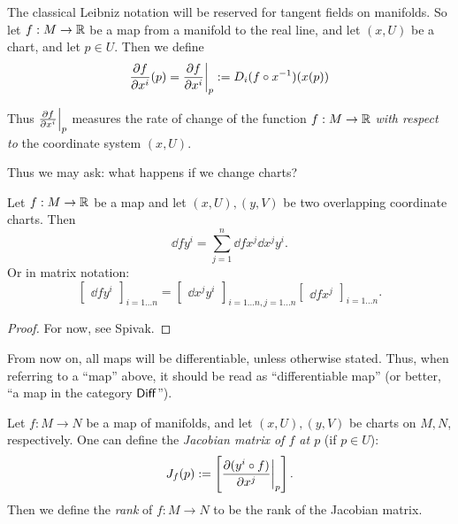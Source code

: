 \documentclass[11pt, english]{article}
\begin{document}
The classical Leibniz notation will be reserved for tangent fields on manifolds. So let $f:M \to \mathbb{R}$ be a map from a manifold to the real line, and let $(x,U)$ be a chart, and let $p \in U$. Then we define
\[
\frac{\partial f}{\partial  x^i} (p) = \restr{\frac{\partial f}{\partial x^i}}p := D_i(f \circ x^{-1})(x(p))
\]

Thus $\restr{\frac{\partial f}{\partial x^i}}p$ measures the rate of change of the function $f:M \to \mathbb{R}$ \emph{with respect to} the coordinate system $(x,U)$.

Thus we may ask: what happens if we change charts?
\begin{prop}
Let $f:M \to \mathbb{R}$ be a map and let $(x,U),(y,V)$ be two overlapping coordinate charts. Then
\[
\dd{f}{y^i} = \sum_{j=1}^n \dd f{x^j} \dd{x^j}{y^i}.
\]
Or in matrix notation:
\[
\begin{bmatrix}
\dd f{y^i}
\end{bmatrix}_{i=1\dotsc n} = \begin{bmatrix} \dd{x^j}{y^i} \end{bmatrix}_{i=1\dotsc n, j=1\dotsc n} \begin{bmatrix} \dd f {x^j} \end{bmatrix}_{i=1 \dotsc n}.
\]
\end{prop}
\begin{proof}
For now, see Spivak.
\end{proof}
\begin{remark}
From now on, all maps will be differentiable, unless otherwise stated. Thus, when referring to a ``map'' above, it should be read as ``differentiable map'' (or better, ``a map in the category $\mathsf{Diff}$'').
\end{remark}

Let $f:M \to N$ be a map of manifolds, and let $(x,U),(y,V)$ be charts on $M,N$, respectively. One can define the \emph{Jacobian matrix of $f$ at $p$} (if $p \in U$):
\[
J_f(p) := \left[ \restr{\dd{(y^i \circ f)}{x^j}}p \right].
\]
Then we define the \emph{rank} of $f:M \to N$ to be the rank of the Jacobian matrix.
\end{document}
